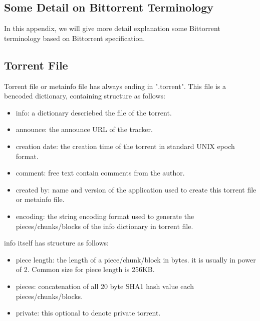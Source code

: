 \begin{appendices}

\chapter{Some Detail on Bittorrent Terminology}

In this appendix, we will give more detail explanation some Bittorrent terminology based on Bittorrent specification. 

\section{Torrent File}
Torrent file or metainfo file has always ending in ".torrent".  
This file is a bencoded dictionary, containing structure as follows:
\begin{itemize}
	\item info: a dictionary descriebed the file of the torrent. 
	\item announce: the announce URL of the tracker.
	\item creation date: the creation time of the torrent in standard UNIX epoch format. 
	\item comment: free text contain comments from the author.
	\item created by: name and version of the application used to create this torrent file or metainfo file.
	\item encoding: the string encoding format used to generate the pieces/chunks/blocks of the info dictionary in torrent file.
\end{itemize}
info itself has structure as follows:
\begin{itemize}
	\item piece length: the length of a piece/chunk/block in bytes. it is usually in power of 2. Common size for piece length is 256KB.
	\item pieces: concatenation of all 20 byte SHA1 hash value each pieces/chunks/blocks.
	\item private: this optional to denote private torrent.
\end{itemize}


\end{appendices}
